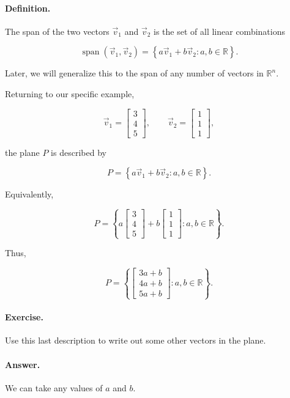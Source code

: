\paragraph{Definition.}
The span of the two vectors $\vec v_1$ and $\vec v_2$ is the set of all linear
combinations

\[
\operatorname{span}(\vec v_1,\vec v_2)
=
\left\{
a\vec v_1+b\vec v_2
:
a,b\in\mathbb{R}
\right\}.
\]

Later, we will generalize this to the span of any number of vectors in
$\mathbb{R}^n$.

Returning to our specific example,

\[
\vec v_1=
\begin{bmatrix}
3\\
4\\
5
\end{bmatrix},
\qquad
\vec v_2=
\begin{bmatrix}
1\\
1\\
1
\end{bmatrix},
\]

the plane $P$ is described by

\[
P
=
\left\{
a\vec v_1+b\vec v_2
:
a,b\in\mathbb{R}
\right\}.
\]

Equivalently,

\[
P
=
\left\{
a
\begin{bmatrix}
3\\
4\\
5
\end{bmatrix}
+
b
\begin{bmatrix}
1\\
1\\
1
\end{bmatrix}
:
a,b\in\mathbb{R}
\right\}.
\]

Thus,

\[
P
=
\left\{
\begin{bmatrix}
3a+b\\
4a+b\\
5a+b
\end{bmatrix}
:
a,b\in\mathbb{R}
\right\}.
\]

\paragraph{Exercise.}
Use this last description to write out some other vectors in the plane.

\paragraph{Answer.}
We can take any values of $a$ and $b$.


